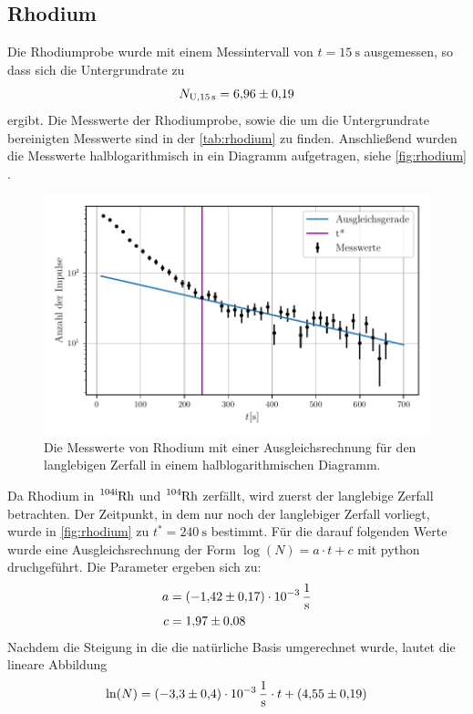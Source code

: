 \subsection{Rhodium}
Die Rhodiumprobe wurde mit einem Messintervall von $t= \SI{15}{\second}$ ausgemessen, so dass sich die Untergrundrate zu 
\begin{equation*}
  N_{\text{U}, \SI{15}{\second}} = \num{6.96\pm 0.19}
\end{equation*}
ergibt.
Die Messwerte der Rhodiumprobe, sowie die um die Untergrundrate bereinigten Messwerte sind in der \autoref{tab:rhodium} zu finden.
Anschließend wurden die Messwerte halblogarithmisch in ein Diagramm aufgetragen, siehe \autoref{fig:rhodium} .
\begin{figure}
  \centering
  \includegraphics[width=\textwidth]{build/rhodium.pdf}
  \caption{Die Messwerte von Rhodium mit einer Ausgleichsrechnung für den langlebigen Zerfall in einem halblogarithmischen Diagramm.}
  \label{fig:rhodium}
\end{figure}
Da Rhodium in $\ce{^{104\text{i}}Rh}$ und $\ce{^{104}Rh}$ zerfällt, wird zuerst der langlebige Zerfall betrachten.
Der Zeitpunkt, in dem nur noch der langlebiger Zerfall vorliegt, wurde in \autoref{fig:rhodium} zu $t^* = \SI{240}{\second}$ bestimmt. 
Für die darauf folgenden Werte wurde eine Ausgleichsrechnung der Form $\log(N) = a \cdot t + c $ mit python druchgeführt. 
Die Parameter ergeben sich zu: 
\begin{align*}
  a &= \SI{-1.42(17)e-3}{\per\second}\\
  c &= \num{1.97 \pm 0.08}
\end{align*}
Nachdem die Steigung in die die natürliche Basis umgerechnet wurde, lautet die lineare Abbildung
\begin{equation} \label{eqn:ln_rho_lang}
  \ln(N) = \SI{-3.3(4)e-3}{\per\second} \cdot t + (\num{4.55 \pm 0.19})
\end{equation}

